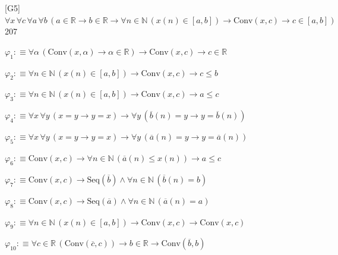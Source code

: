 \begin{fullproof}{[G5]}{$\forall x\,\forall c\,\forall a\,\forall b\,(a \in \mathbb{R} \to b \in \mathbb{R} \to \forall n \in \mathbb{N}\,(x(n) \in [a,b]) \to \mathrm{Conv}(x,c) \to c \in [a,b])$}{207}
\begin{ptree}
\noLine
{}
\noLine
{}
\noLine
{}
\end{ptree}
\begin{abbrevlist}
\item $\varphi_{1} :\equiv \forall \alpha\,(\mathrm{Conv}(x,\alpha) \to \alpha \in \mathbb{R}) \to \mathrm{Conv}(x,c) \to c \in \mathbb{R}$
\item $\varphi_{2} :\equiv \forall n \in \mathbb{N}\,(x(n) \in [a,b]) \to \mathrm{Conv}(x,c) \to c \leq b$
\item $\varphi_{3} :\equiv \forall n \in \mathbb{N}\,(x(n) \in [a,b]) \to \mathrm{Conv}(x,c) \to a \leq c$
\item $\varphi_{4} :\equiv \forall x\,\forall y\,(x = y \to y = x) \to \forall y\,(\overline{b}(n) = y \to y = \overline{b}(n))$
\item $\varphi_{5} :\equiv \forall x\,\forall y\,(x = y \to y = x) \to \forall y\,(\overline{a}(n) = y \to y = \overline{a}(n))$
\item $\varphi_{6} :\equiv \mathrm{Conv}(x,c) \to \forall n \in \mathbb{N}\,(\overline{a}(n) \leq x(n)) \to a \leq c$
\item $\varphi_{7} :\equiv \mathrm{Conv}(x,c) \to \mathrm{Seq}(\overline{b}) \land \forall n \in \mathbb{N}\,(\overline{b}(n) = b)$
\item $\varphi_{8} :\equiv \mathrm{Conv}(x,c) \to \mathrm{Seq}(\overline{a}) \land \forall n \in \mathbb{N}\,(\overline{a}(n) = a)$
\item $\varphi_{9} :\equiv \forall n \in \mathbb{N}\,(x(n) \in [a,b]) \to \mathrm{Conv}(x,c) \to \mathrm{Conv}(x,c)$
\item $\varphi_{10} :\equiv \forall c \in \mathbb{R}\,(\mathrm{Conv}(\overline{c},c)) \to b \in \mathbb{R} \to \mathrm{Conv}(\overline{b},b)$

\end{abbrevlist}
\end{fullproof}
